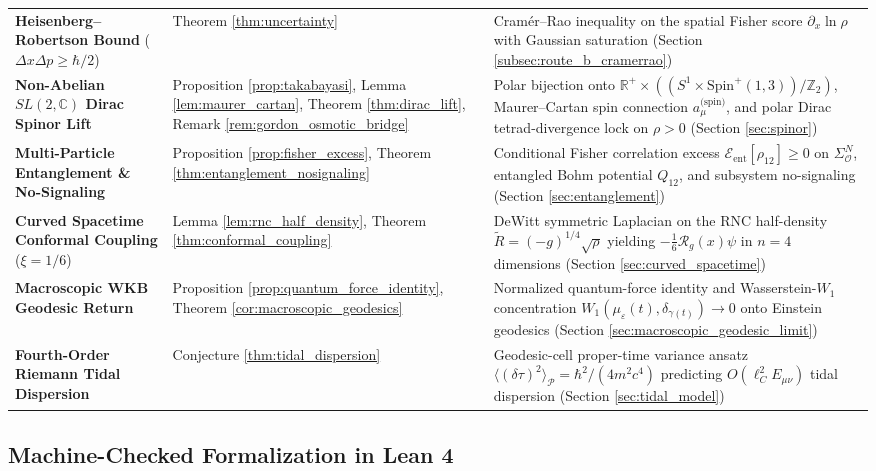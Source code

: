 \documentclass[11pt, a4paper]{article}
\theoremstyle{definition}
\begin{document}
\begin{table}[!htbp]
\begin{tabularx}{\textwidth}{>{\raggedright\arraybackslash}p{} >{\raggedright\arraybackslash}p{} >{\raggedright\arraybackslash}X}
\addlinespace
\textbf{Heisenberg--Robertson Bound} ($\Delta x \Delta p \ge \hbar/2$) & Theorem \ref{thm:uncertainty} & Cram\'{e}r--Rao inequality on the spatial Fisher score $\partial_x\ln\rho$ with Gaussian saturation (Section \ref{subsec:route_b_cramerrao}) \\
\addlinespace
\textbf{Non-Abelian $SL(2,\mathbb{C})$ Dirac Spinor Lift} & Proposition \ref{prop:takabayasi}, Lemma \ref{lem:maurer_cartan}, Theorem \ref{thm:dirac_lift}, Remark \ref{rem:gordon_osmotic_bridge} & Polar bijection onto $\mathbb{R}^+ \times ((S^1 \times \text{Spin}^+(1,3))/\mathbb{Z}_2)$, Maurer--Cartan spin connection $a_\mu^{\text{(spin)}}$, and polar Dirac tetrad-divergence lock on $\rho > 0$ (Section \ref{sec:spinor}) \\
\addlinespace
\textbf{Multi-Particle Entanglement \& No-Signaling} & Proposition \ref{prop:fisher_excess}, Theorem \ref{thm:entanglement_nosignaling} & Conditional Fisher correlation excess $\mathcal{E}_{\text{ent}}[\rho_{12}] \ge 0$ on $\Sigma_{\mathcal{O}}^N$, entangled Bohm potential $Q_{12}$, and subsystem no-signaling (Section \ref{sec:entanglement}) \\
\addlinespace
\textbf{Curved Spacetime Conformal Coupling} ($\xi = 1/6$) & Lemma \ref{lem:rnc_half_density}, Theorem \ref{thm:conformal_coupling} & DeWitt symmetric Laplacian on the RNC half-density $\tilde{R} = (-g)^{1/4}\sqrt{\rho}$ yielding $-\frac{1}{6}\mathcal{R}_g(x)\psi$ in $n=4$ dimensions (Section \ref{sec:curved_spacetime}) \\
\addlinespace
\textbf{Macroscopic WKB Geodesic Return} & Proposition \ref{prop:quantum_force_identity}, Theorem \ref{cor:macroscopic_geodesics} & Normalized quantum-force identity and Wasserstein-$W_1$ concentration $W_1(\mu_\varepsilon(t), \delta_{\gamma(t)}) \to 0$ onto Einstein geodesics \cite{Figalli2012} (Section \ref{sec:macroscopic_geodesic_limit}) \\
\addlinespace
\textbf{Fourth-Order Riemann Tidal Dispersion} & Conjecture \ref{thm:tidal_dispersion} & Geodesic-cell proper-time variance ansatz $\langle(\delta\tau)^2\rangle_{\mathcal{P}} = \hbar^2/(4m^2c^4)$ predicting $O(\ell_C^2 E_{\mu\nu})$ tidal dispersion (Section \ref{sec:tidal_model}) \\
\bottomrule
\end{tabularx}
\end{table}

\FloatBarrier
\subsection{Machine-Checked Formalization in Lean 4}
\label{sec:lean_formalization}
\end{document}
